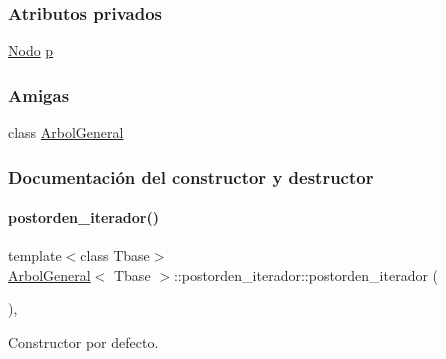 \subsubsection*{Atributos privados}
\begin{DoxyCompactItemize}
\item 
\hyperlink{classArbolGeneral_a12cc1b74a9095d89bc7334290d332f7a}{Nodo} \hyperlink{classArbolGeneral_1_1postorden__iterador_ae269432023776674c7633eadeb8c30e0}{p}
\end{DoxyCompactItemize}
\subsubsection*{Amigas}
\begin{DoxyCompactItemize}
\item 
class \hyperlink{classArbolGeneral_1_1postorden__iterador_a9c06e31b7c3e0d4ee5b03003d32935a5}{Arbol\+General}
\end{DoxyCompactItemize}


\subsubsection{Documentación del constructor y destructor}
\hypertarget{classArbolGeneral_1_1postorden__iterador_a2ac2dbbaf71087cf7d5964b45b4bca1e}{}\label{classArbolGeneral_1_1postorden__iterador_a2ac2dbbaf71087cf7d5964b45b4bca1e} 
\paragraph{\texorpdfstring{postorden\+\_\+iterador()}{postorden\_iterador()}\hspace{0.1cm}{\footnotesize\ttfamily [1/3]}}
{\footnotesize\ttfamily template$<$class Tbase$>$ \\
\hyperlink{classArbolGeneral}{Arbol\+General}$<$ Tbase $>$\+::postorden\+\_\+iterador\+::postorden\+\_\+iterador (\begin{DoxyParamCaption}{ }\end{DoxyParamCaption})\hspace{0.3cm}{\ttfamily [inline]}, {\ttfamily [private]}}



Constructor por defecto. 

